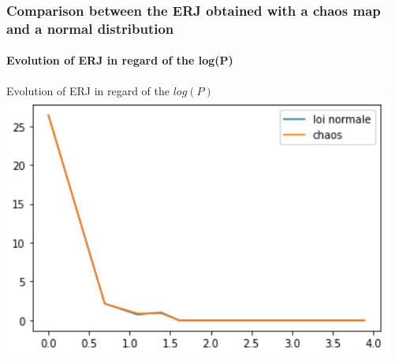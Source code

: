 \documentclass{beamer}
\begin{document}
\begin{frame}
	\frametitle{\color{velvet}Comparison between the ERJ obtained with a chaos map and a normal distribution}
	\framesubtitle{Evolution of ERJ in regard of the log(P)}
	Evolution of ERJ in regard of the $log(P)$
	\includegraphics[scale=0.7]{normale/erreur_en_fct_de_logP_2.png}
\end{frame}
\end{document}
